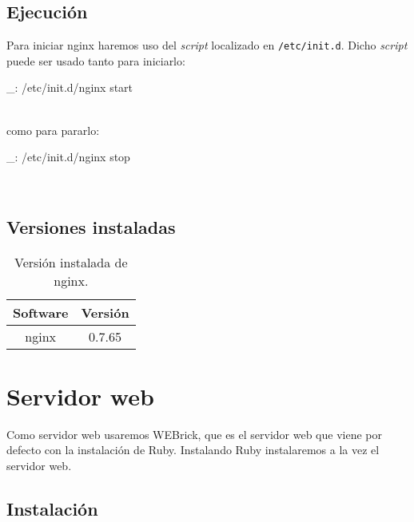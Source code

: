 \subsection{Ejecución}

Para iniciar nginx haremos uso del \emph{script} localizado en \texttt{/etc/init.d}. Dicho \emph{script} puede ser usado tanto para iniciarlo:

\begin{bashcode}
_: /etc/init.d/nginx start
\end{bashcode}
\\

como para pararlo:

\begin{bashcode}
_: /etc/init.d/nginx stop
\end{bashcode}
\\


\subsection{Versiones instaladas}

\begin{table}[!htbp]
\centering
   \begin{tabular}{|c|c|}
      \hline
      \textbf{Software} & \textbf{Versión} \\ \hline
      nginx & 0.7.65 \\ \hline
   \end{tabular}
\caption{Versión instalada de nginx.}
\label{table:web-mysql-versions}
\end{table}




\section{Servidor web}


Como servidor web usaremos WEBrick, que es el servidor web que viene por defecto con la instalación de Ruby. Instalando Ruby instalaremos a la vez el servidor web.


\subsection{Instalación}

